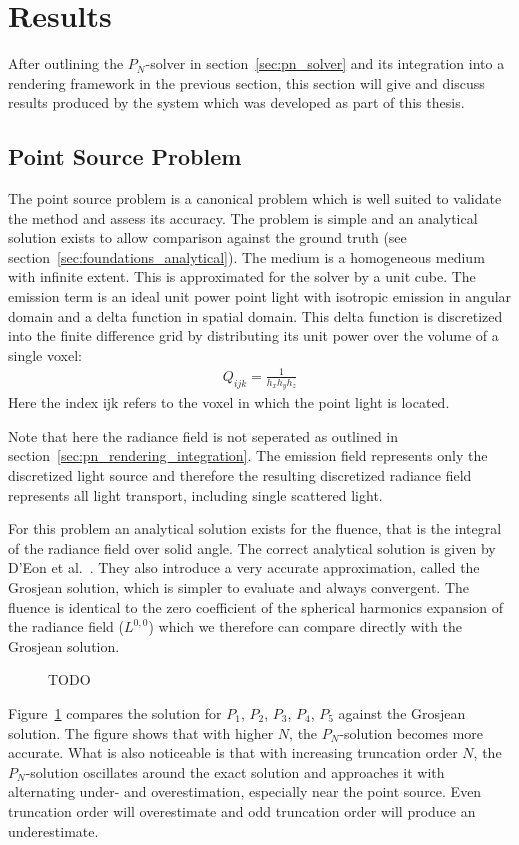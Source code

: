 \section{Results}
\label{sec:pn_results}

After outlining the $P_N$-solver in section~\ref{sec:pn_solver} and its integration into a rendering framework in the previous section, this section will give and discuss results produced by the system which was developed as part of this thesis.

\subsection{Point Source Problem}
\label{sec:pn_results_pointsource}

The point source problem is a canonical problem which is well suited to validate the method and assess its accuracy. The problem is simple and an analytical solution exists to allow comparison against the ground truth (see section~\ref{sec:foundations_analytical}). The medium is a homogeneous medium with infinite extent. This is approximated for the solver by a unit cube. The emission term is an ideal unit power point light with isotropic emission in angular domain and a delta function in spatial domain. This delta function is discretized into the finite difference grid by distributing its unit power over the volume of a single voxel:
\begin{align}
Q_{ijk} = \frac{1}{h_xh_yh_z}
\end{align}
Here the index {ijk} refers to the voxel in which the point light is located.

Note that here the radiance field is not seperated as outlined in section~\ref{sec:pn_rendering_integration}. The emission field represents only the discretized light source and therefore the resulting discretized radiance field represents all light transport, including single scattered light.

For this problem an analytical solution exists for the fluence, that is the integral of the radiance field over solid angle. The correct analytical solution is given by D'Eon et al.~\cite{dEon11}. They also introduce a very accurate approximation, called the Grosjean solution, which is simpler to evaluate and always convergent. The fluence is identical to the zero coefficient of the spherical harmonics expansion of the radiance field ($L^{0,0}$) which we therefore can compare directly with the Grosjean solution.
\begin{figure}[h]
\centering
{}
\caption{TODO}
\label{fig:pn_results_pointsource_1}
\end{figure}
Figure~\ref{fig:pn_results_pointsource_1} compares the solution for $P_1$, $P_2$, $P_3$, $P_4$, $P_5$ against the Grosjean solution. The figure shows that with higher $N$, the $P_N$-solution becomes more accurate. What is also noticeable is that with increasing truncation order $N$, the $P_N$-solution oscillates around the exact solution and approaches it with alternating under- and overestimation, especially near the point source. Even truncation order will overestimate and odd truncation order will produce an underestimate. 

